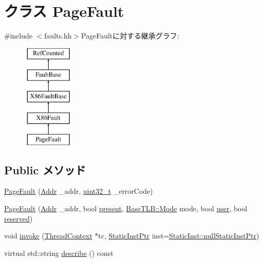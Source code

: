 \hypertarget{classX86ISA_1_1PageFault}{
\section{クラス PageFault}
\label{classX86ISA_1_1PageFault}
}


{\ttfamily \#include $<$faults.hh$>$}PageFaultに対する継承グラフ:\begin{figure}[H]
\begin{center}
\leavevmode
\includegraphics[height=5cm]{classX86ISA_1_1PageFault}
\end{center}
\end{figure}
\subsection*{Public メソッド}
\begin{DoxyCompactItemize}
\item 
\hyperlink{classX86ISA_1_1PageFault_abf9b5f62d8dedad4159f6f999492af6e}{PageFault} (\hyperlink{base_2types_8hh_af1bb03d6a4ee096394a6749f0a169232}{Addr} \_\-addr, \hyperlink{Type_8hh_a435d1572bf3f880d55459d9805097f62}{uint32\_\-t} \_\-errorCode)
\item 
\hyperlink{classX86ISA_1_1PageFault_aab0051d707e5450feb339851a04285e5}{PageFault} (\hyperlink{base_2types_8hh_af1bb03d6a4ee096394a6749f0a169232}{Addr} \_\-addr, bool \hyperlink{namespaceX86ISA_a2c4bc7438a48bd4bbdd7ed9b629a6ec6}{present}, \hyperlink{classBaseTLB_a46c8a310cf4c094f8c80e1cb8dc1f911}{BaseTLB::Mode} mode, bool \hyperlink{classX86ISA_1_1PageFault_adc1042328d36e83e5c72a380f2c97697}{user}, bool \hyperlink{classX86ISA_1_1PageFault_a5858891cfed455f1cea3c680b8adefad}{reserved})
\item 
void \hyperlink{classX86ISA_1_1PageFault_a2bd783b42262278d41157d428e1f8d6f}{invoke} (\hyperlink{classThreadContext}{ThreadContext} $\ast$tc, \hyperlink{classRefCountingPtr}{StaticInstPtr} inst=\hyperlink{classStaticInst_aa793d9793af735f09096369fb17567b6}{StaticInst::nullStaticInstPtr})
\item 
virtual std::string \hyperlink{classX86ISA_1_1PageFault_a1d7f1c12bd9a77eda766e6e8dca31e50}{describe} () const 
\end{DoxyCompactItemize}
